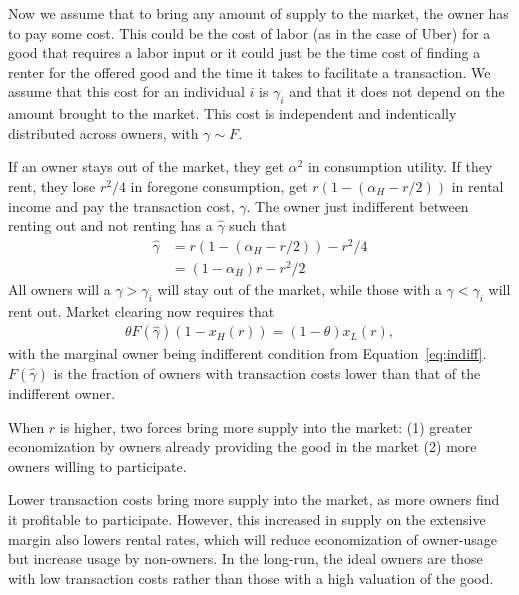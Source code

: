 
Now we assume that to bring any amount of supply to the market, the owner has to pay some cost.
This could be the cost of labor (as in the case of Uber) for a good that requires a labor input or it could just be the time cost of finding a renter for the offered good and the time it takes to facilitate a transaction.  
We assume that this cost for an individual $i$ is $\gamma_i$ and that it does not depend on the amount brought to the market.
This cost is independent and indentically distributed across owners, with $\gamma \sim F$.

If an owner stays out of the market, they get $\alpha^2$ in consumption utility.
If they rent, they lose $r^2/4$ in foregone consumption, get $r (1 - (\alpha_H - r/2))$ in rental income and pay the transaction cost, $\gamma$.
The owner just indifferent between renting out and not renting has a $\hat{\gamma}$ such that
\begin{align} \label{eq:indiff}
  \hat{\gamma} & = r (1 - (\alpha_H - r/2)) - r^2/4 \\
               & =  (1-\alpha_H)r - r^2/2 
\end{align}
All owners will a $\gamma > \gamma_i$ will stay out of the market, while those with a $\gamma < \gamma_i$ will rent out.
Market clearing now requires that
\begin{align}
  \theta F(\hat{\gamma})(1 - x_H(r)) = (1-\theta)x_L(r), 
\end{align} 
with the marginal owner being indifferent condition from Equation~\ref{eq:indiff}. 
$F(\hat{\gamma})$ is the fraction of owners with transaction costs lower than that of the indifferent owner. 

When $r$ is higher, two forces bring more supply into the market:
(1) greater economization by owners already providing the good in the market
(2) more owners willing to participate.

Lower transaction costs bring more supply into the market, as more owners find it profitable to participate.
However, this increased in supply on the extensive margin also lowers rental rates, which will reduce economization of owner-usage but increase usage by non-owners.
In the long-run, the ideal owners are those with low transaction costs rather than those with a high valuation of the good.

